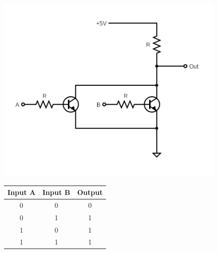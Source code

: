     \begin{figure}[H]   
        \begin{minipage}{0.5\textwidth}
            \centering
            \includegraphics[width=1.1\textwidth]{figures/circuits/OR.png}
            \label{fig:OR_circuit} 
        \end{minipage}
        \begin{minipage}{0.5\textwidth}
            \centering
            \begin{tabular}{|c|c|c|}
                \hline
                Input A & Input B & Output \\
                \hline
                0 & 0 & 0 \\
                0 & 1 & 1 \\
                1 & 0 & 1 \\
                1 & 1 & 1 \\
                \hline
            \end{tabular}
            \label{tab:OR_table}
        \end{minipage}
	\end{figure}
